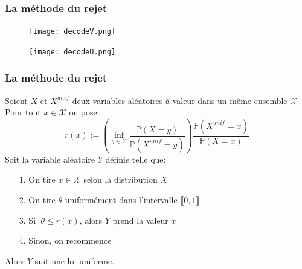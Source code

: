 \documentclass[10pt,a4paper]{beamer}
\theoremstyle{plain}
\theoremstyle{definition}
\begin{document}
\begin{frame}
\frametitle{La méthode du rejet}
\begin{figure}[h]
\begin{center}
\texttt{[image: decodeV.png]}
\end{center}
\end{figure}

\vspace{-0.1in}

\begin{figure}[h]
\begin{center}
\texttt{[image: decodeU.png]}
\end{center}
\end{figure}
\end{frame}

\begin{frame}
\frametitle{La méthode du rejet}
Soient $X$ et $X^{unif}$ deux variables aléatoires à valeur dans un même ensemble $\mathcal{X}$
Pour tout $x \in \mathcal{X}$ on pose :
\begin{equation*}
    r(x) := \left(\inf\limits_{y \in \mathcal{X}}\frac{\mathbb{P}(X=y)}{\mathbb{P}(X^{unif}=y)}\right) \frac{\mathbb{P}(X^{unif}=x)}{\mathbb{P}(X=x)}
\end{equation*}
\vspace{0.2in}
Soit la variable aléatoire $Y$ définie telle que:
\begin{enumerate}
\item[1.] On tire $x \in \mathcal{X}$ selon la distribution $X$
\vspace{0.1in}
\item[2.] On tire $\theta$ uniformément dans l'intervalle $\llbracket 0,1 \rrbracket$
\vspace{0.1in}
\item[3.] Si $\;\theta \leq r(x)$, alors $Y$ prend la valeur $x$
\vspace{0.1in}
\item[4.] Sinon, on recommence
\end{enumerate}
\vspace{0.2in}
Alors $Y$ suit une loi uniforme. 

\end{frame}
\end{document}

